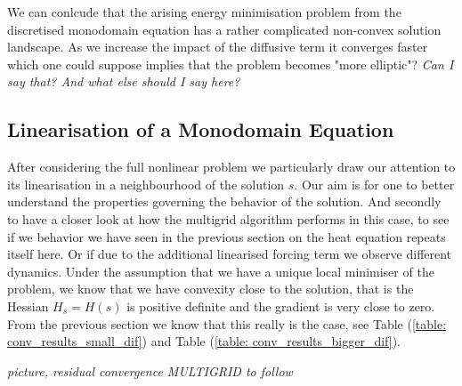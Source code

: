 \documentclass[../draft_1.tex]{subfiles}
\begin{document}
We can conlcude that the arising energy minimisation problem from the discretised monodomain equation has a rather complicated non-convex solution landscape. As we increase the impact of the diffusive term it converges faster which one could suppose implies that the problem becomes "more elliptic"? \textit{Can I say that? And what else should I say here?}

\FloatBarrier
\subsection{Linearisation of a Monodomain Equation}

After considering the full nonlinear problem we particularly draw our attention to its linearisation in a neighbourhood of the solution $s$. Our aim is for one to better understand the properties governing the behavior of the solution. And secondly to have a closer look at how the multigrid algorithm performs in this case, to see if we behavior we have seen in  the previous section on the heat equation repeats itself here. Or if due to the additional linearised forcing term we observe different dynamics. Under the assumption that we have a unique local minimiser of the problem, we know that we have convexity close to the solution, that is the Hessian $H_s = H(s)$ is positive definite and the gradient is very close to zero. From the previous section we know that this really is the case, see Table (\ref{table: conv_results_small_dif}) and Table (\ref{table: conv_results_bigger_dif}). 




\textit{picture, residual convergence MULTIGRID to follow }
\smallskip
\\
\end{document}
